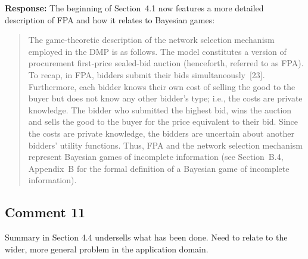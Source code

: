 \documentclass[10pt,a4paper,notitlepage]{article}
\numberwithin{equation}{section}
\begin{document}
\textbf{Response:}
The beginning of Section~4.1 now features a more detailed description of FPA and how it relates to Bayesian games:
\begin{quote}
The game-theoretic description of the network selection mechanism employed in the DMP is as follows. The model constitutes a version of procurement first-price sealed-bid auction (henceforth, referred to as FPA). To recap, in FPA, bidders submit their bids simultaneously~[23]. Furthermore, each bidder knows their own cost of selling the good to the buyer but does not know any other bidder's type; i.e., the costs are private knowledge. The bidder who submitted the highest bid, wins the auction and sells the good to the buyer for the price equivalent to their bid. Since the costs are private knowledge, the bidders are uncertain about another bidders' utility functions. Thus, FPA and the network selection mechanism represent Bayesian games of incomplete information (see Section~B.4, Appendix~B for the formal definition of a Bayesian game of incomplete information).
\end{quote}

\subsection{Comment 11}
Summary in Section 4.4 undersells what has been done. Need to relate to the wider, more general problem in the application domain.
\end{document}
